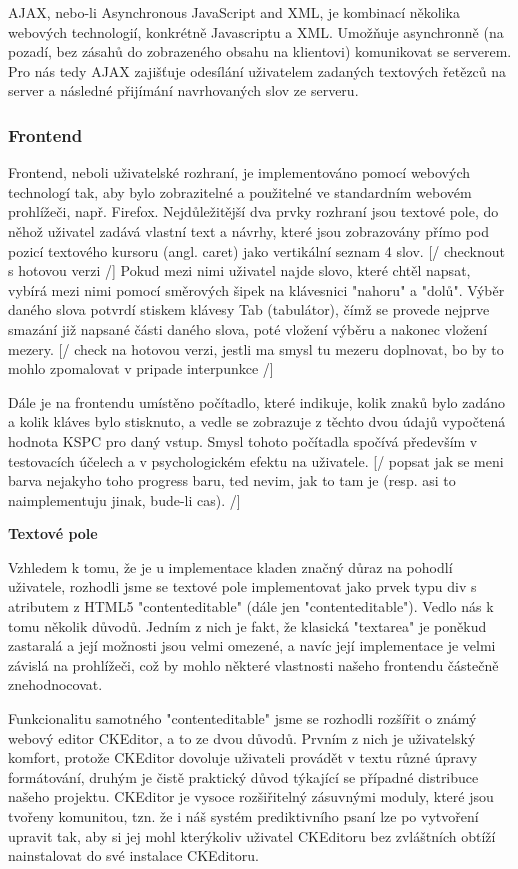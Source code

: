 \documentclass{article}
\begin{document}
AJAX, nebo-li Asynchronous JavaScript and XML, je kombinací několika webových technologií, konkrétně Javascriptu a XML. Umožňuje asynchronně (na pozadí, bez zásahů do zobrazeného obsahu na klientovi) komunikovat se serverem. Pro nás tedy AJAX zajišťuje odesílání uživatelem zadaných textových řetězců na server a následné přijímání navrhovaných slov ze serveru.

\subsubsection{Frontend}

Frontend, neboli uživatelské rozhraní, je implementováno pomocí webových technologí tak, aby bylo zobrazitelné a použitelné ve standardním webovém prohlížeči, např. Firefox. Nejdůležitější dva prvky rozhraní jsou textové pole, do něhož uživatel zadává vlastní text a návrhy, které jsou zobrazovány přímo pod pozicí textového kursoru (angl. caret) jako vertikální seznam 4 slov. [/ checknout s hotovou verzi /] Pokud mezi nimi uživatel najde slovo, které chtěl napsat, vybírá mezi nimi pomocí směrových šipek na klávesnici "nahoru" a "dolů". Výběr daného slova potvrdí stiskem klávesy Tab (tabulátor), čímž se provede nejprve smazání již napsané části daného slova, poté vložení výběru a nakonec vložení mezery. [/ check na hotovou verzi, jestli ma smysl tu mezeru doplnovat, bo by to mohlo zpomalovat v pripade interpunkce /] 

Dále je na frontendu umístěno počítadlo, které indikuje, kolik znaků bylo zadáno a kolik kláves bylo stisknuto, a vedle se zobrazuje z těchto dvou údajů vypočtená hodnota KSPC pro daný vstup. Smysl tohoto počítadla spočívá především v testovacích účelech a v psychologickém efektu na uživatele. [/ popsat jak se meni barva nejakyho toho progress baru, ted nevim, jak to tam je (resp. asi to naimplementuju jinak, bude-li cas). /]

{\bf Textové pole}

Vzhledem k tomu, že je u implementace kladen značný důraz na pohodlí uživatele, rozhodli jsme se textové pole implementovat jako prvek typu div s atributem z HTML5 "contenteditable" (dále jen "contenteditable"). Vedlo nás k tomu několik důvodů. Jedním z nich je fakt, že klasická "textarea" je poněkud zastaralá a její možnosti jsou velmi omezené, a navíc její implementace je velmi závislá na prohlížeči, což by mohlo některé vlastnosti našeho frontendu částečně znehodnocovat. 

Funkcionalitu samotného "contenteditable" jsme se rozhodli rozšířit o známý webový editor CKEditor, a to ze dvou důvodů. Prvním z nich je uživatelský komfort, protože CKEditor dovoluje uživateli provádět v textu různé úpravy formátování, druhým je čistě praktický důvod týkající se případné distribuce našeho projektu. CKEditor je vysoce rozšiřitelný zásuvnými moduly, které jsou tvořeny komunitou, tzn. že i náš systém prediktivního psaní lze po vytvoření upravit tak, aby si jej mohl kterýkoliv uživatel CKEditoru bez zvláštních obtíží nainstalovat do své instalace CKEditoru.
\end{document}
